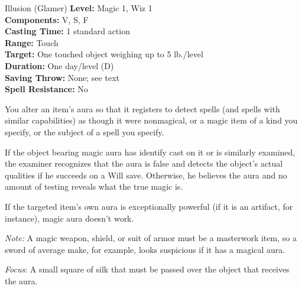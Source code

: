 {Illusion (Glamer)}
{
	\textbf{Level:}
	Magic 1, Wiz 1\\
	\textbf{Components:}
	V, S, F\\
	\textbf{Casting Time:}
	1 standard action\\
	\textbf{Range:}
	Touch\\
	\textbf{Target:}
	One touched object weighing up to 5 lb./level\\
	\textbf{Duration:}
	One day/level (D)\\
	\textbf{Saving Throw:}
	None; see text\\
	\textbf{Spell Resistance:}
	No\\
}
{
	You alter an item's aura so that it registers to detect spells (and spells with similar capabilities) as though it were nonmagical, or a magic item of a kind you specify, or the subject of a spell you specify.

	If the object bearing magic aura has identify cast on it or is similarly examined, the examiner recognizes that the aura is false and detects the object's actual qualities if he succeeds on a Will save. Otherwise, he believes the aura and no amount of testing reveals what the true magic is.

	If the targeted item's own aura is exceptionally powerful (if it is an artifact, for instance), magic aura doesn't work.

	\textit{Note:} A magic weapon, shield, or suit of armor must be a masterwork item, so a sword of average make, for example, looks suspicious if it has a magical aura.

	\textit{Focus}:
	A small square of silk that must be passed over the object that receives the aura.

}
